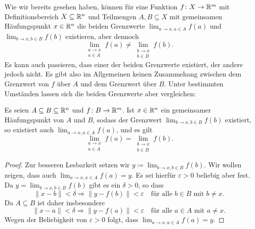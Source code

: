 \documentclass[a4paper,10pt]{article}
\begin{document}
Wie wir bereits gesehen haben, können für eine Funktion $f \colon X \to \mathbb{R}^m$ mit Definitionsbereich $X \subseteq \mathbb{R}^n$ und Teilmengen $A, B \subseteq X$ mit gemeinsamen Häufungspunkt $x \in \mathbb{R}^n$ die beiden Grenzwerte $\lim_{a \to x, a \in A} f(a)$ und $\lim_{b \to x, b \in B} f(b)$ existieren, aber dennoch
\[
 \lim_{\substack{a \to x \\ a \in A}} f(a)
 \neq
 \lim_{\substack{b \to x \\ b \in B}} f(b).
\]
Es kann auch passieren, dass einer der beiden Grenzwerte existiert, der andere jedoch nicht. Es gibt also im Allgemeinen keinen Zusammehang zwischen dem Grenzwert von $f$ über $A$ und dem Grenzwert über $B$. Unter bestimmten Umständen lassen sich die beiden Grenzwerte aber vergleichen:


\begin{lem}\label{lem: Grenzwerte auf Teilmengen}
 Es seien $A \subseteq B \subseteq \mathbb{R}^n$ und $f \colon B \to \mathbb{R}^m$. Ist $x \in \mathbb{R}^n$ ein gemeinsamer Häufungspunkt von $A$ und $B$, sodass der Grenzwert $\lim_{b \to x, b \in B} f(b)$ existiert, so existiert auch $\lim_{a \to x, a \in A} f(a)$, und es gilt
 \[
  \lim_{\substack{a \to x \\ a \in A}} f(a)
  = \lim_{\substack{b \to x \\ b \in B}} f(b).
 \]
\end{lem}
\begin{proof}
 Zur besseren Lesbarkeit setzen wir $y \coloneqq \lim_{b \to x, b \in B} f(b)$. Wir wollen zeigen, dass auch $\lim_{a \to x, x \in A} f(a) = y$. Es sei hierfür $\varepsilon > 0$ beliebig aber fest. Da \mbox{$y = \lim_{b \to x, b \in B} f(b)$} gibt es ein $\delta > 0$, so dass
 \[
  \|x-b\| < \delta \Rightarrow \|y-f(b)\| < \varepsilon \quad \text{für alle $b \in B$ mit $b \neq x$}.
 \]
 Da $A \subseteq B$ ist daher insbesondere
 \[
  \|x-a\| < \delta \Rightarrow \|y-f(a)\| < \varepsilon \quad \text{für alle $a \in A$ mit $a \neq x$}.
 \]
 Wegen der Beliebigkeit von $\varepsilon > 0$ folgt, dass $\lim_{a \to x, a \in A} f(a) = y$.
\end{proof}
\end{document}
